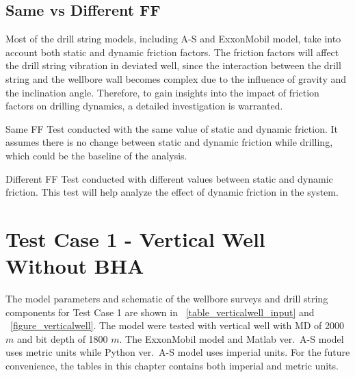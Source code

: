 
\subsection{Same vs Different FF}

Most of the drill string models, including A-S and ExxonMobil model, take into account both static and dynamic friction factors. The friction factors will affect the drill string vibration in deviated well, since the interaction between the drill string and the wellbore wall becomes complex due to the influence of gravity and the inclination angle.
Therefore, to gain insights into the impact of friction factors on drilling dynamics, a detailed investigation is warranted.

\begin{definition}{Same FF}
Test conducted with the same value of static and dynamic friction. It assumes there is no change between static and dynamic friction while drilling, which could be the baseline of the analysis.
\end{definition}
\begin{definition}{Different FF}
Test conducted with different values between static and dynamic friction. This test will help analyze the effect of dynamic friction in the system.
\end{definition}


\section{Test Case 1 - Vertical Well Without BHA}
The model parameters and schematic of the wellbore surveys and drill string components for Test Case 1 are shown in \tablename~\ref{table_verticalwell_input} and \figurename~\ref{figure_verticalwell}. The model were tested with vertical well with MD of 2000 $m$ and bit depth of 1800 $m$. The ExxonMobil model and Matlab ver.\ A-S model uses metric units while Python ver.\ A-S model uses imperial units. For the future convenience, the tables in this chapter contains both imperial and metric units.

